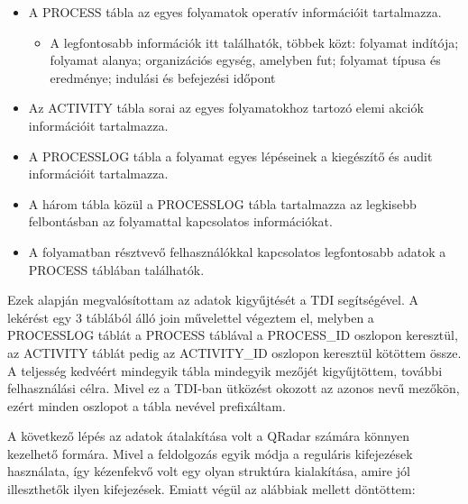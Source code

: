 \begin{itemize}
	\item A PROCESS tábla az egyes folyamatok operatív információit tartalmazza. 
	
	\begin{itemize}
		\item A legfontosabb információk itt találhatók, többek közt: folyamat indítója; folyamat alanya; organizációs egység, amelyben fut; folyamat típusa és eredménye; indulási és befejezési időpont
	\end{itemize}
	
	\item Az ACTIVITY tábla sorai az egyes folyamatokhoz tartozó elemi akciók információit tartalmazza.
	
	\item A PROCESSLOG tábla a folyamat egyes lépéseinek a kiegészítő és audit információit tartalmazza.
	
	\item A három tábla közül a PROCESSLOG tábla tartalmazza az legkisebb felbontásban az folyamattal kapcsolatos információkat.
	
	\item A folyamatban résztvevő felhasználókkal kapcsolatos legfontosabb adatok a PROCESS táblában találhatók.
\end{itemize}

Ezek alapján megvalósítottam az adatok kigyűjtését a TDI segítségével. A lekérést egy 3 táblából álló join művelettel végeztem el, melyben a PROCESSLOG táblát a PROCESS táblával a PROCESS\_ID oszlopon keresztül, az ACTIVITY táblát pedig az ACTIVITY\_ID oszlopon keresztül kötöttem össze. A teljesség kedvéért mindegyik tábla mindegyik mezőjét kigyűjtöttem, további felhasználási célra. Mivel ez a TDI-ban ütközést okozott az azonos nevű mezőkön, ezért minden oszlopot a tábla nevével prefixáltam.

A következő lépés az adatok átalakítása volt a QRadar számára könnyen kezelhető formára. Mivel a feldolgozás egyik módja a reguláris kifejezések használata, így kézenfekvő volt egy olyan struktúra kialakítása, amire jól illeszthetők ilyen kifejezések. Emiatt végül az alábbiak mellett döntöttem:

